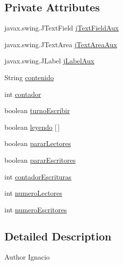 \subsection*{Private Attributes}
\begin{DoxyCompactItemize}
\item 
javax.\+swing.\+J\+Text\+Field \mbox{\hyperlink{classpecl3ignacioriberasemaforos_1_1_libro_a4688b8afa2701493ac45bfbc35b1f8ca}{j\+Text\+Field\+Aux}}
\item 
javax.\+swing.\+J\+Text\+Area \mbox{\hyperlink{classpecl3ignacioriberasemaforos_1_1_libro_ab049d0206067da023a6231357b7efc75}{j\+Text\+Area\+Aux}}
\item 
javax.\+swing.\+J\+Label \mbox{\hyperlink{classpecl3ignacioriberasemaforos_1_1_libro_a126ba60cdc31f30cdf071606013951b7}{j\+Label\+Aux}}
\item 
String \mbox{\hyperlink{classpecl3ignacioriberasemaforos_1_1_libro_ab2fc8d572a85bf24b8c3558b7739d8a8}{contenido}}
\item 
int \mbox{\hyperlink{classpecl3ignacioriberasemaforos_1_1_libro_a3e40890fd6a99fd333cc76188bf0841b}{contador}}
\item 
boolean \mbox{\hyperlink{classpecl3ignacioriberasemaforos_1_1_libro_a970295d15bdfebb950a6fca5c300562a}{turno\+Escribir}}
\item 
boolean \mbox{\hyperlink{classpecl3ignacioriberasemaforos_1_1_libro_ac3024d92434cf24e0ebf9eca9c91f86a}{leyendo}} \mbox{[}$\,$\mbox{]}
\item 
boolean \mbox{\hyperlink{classpecl3ignacioriberasemaforos_1_1_libro_af552bf9166c3f93d14f20bdaca4a0735}{parar\+Lectores}}
\item 
boolean \mbox{\hyperlink{classpecl3ignacioriberasemaforos_1_1_libro_a3b3677781b08023845a9279e42d6e731}{parar\+Escritores}}
\item 
int \mbox{\hyperlink{classpecl3ignacioriberasemaforos_1_1_libro_a94d54e5e2f7b6bb396e9eaa6799fdbe9}{contador\+Escrituras}}
\item 
int \mbox{\hyperlink{classpecl3ignacioriberasemaforos_1_1_libro_aab14f16eb696d97ce1373e7325b61077}{numero\+Lectores}}
\item 
int \mbox{\hyperlink{classpecl3ignacioriberasemaforos_1_1_libro_ad4d82015922415d96864d1370a3af2c5}{numero\+Escritores}}
\end{DoxyCompactItemize}


\subsection{Detailed Description}
\begin{DoxyAuthor}{Author}
Ignacio 
\end{DoxyAuthor}


